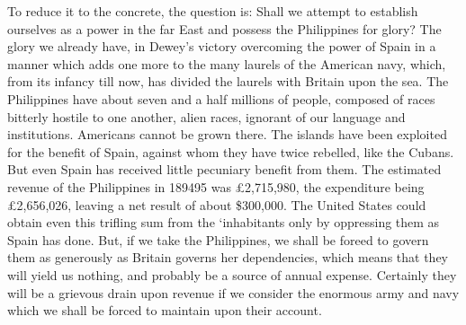 \documentclass[11pt,openany]{book}
\begin{document}
To reduce it to the concrete, the question is: Shall we attempt to establish ourselves as a power in the far East and possess the Philippines for glory? The glory we already have, in Dewey's victory overcoming the power of Spain in a manner which adds one more to the many laurels of the American navy, which, from its infancy till now, has divided the laurels with Britain upon the sea. The Philippines have about seven and a half millions of people, composed of races bitterly hostile to one another, alien races, ignorant of our language and institutions. Americans cannot be grown there. The islands have been exploited for the benefit of Spain, against whom they have twice rebelled, like the Cubans. But even Spain has received little pecuniary benefit from them. The estimated revenue of the Philippines in 189495 was £2,715,980, the expenditure being £2,656,026, leaving a net result of about \$300,000. The United States could obtain even this trifling sum from the `inhabitants only by oppressing them as Spain has done. But, if we take the Philippines, we shall be foreed to govern them as generously as Britain governs her dependencies, which means that they will yield us nothing, and probably be a source of annual expense. Certainly they will be a grievous drain upon revenue if we consider the enormous army and navy which we shall be forced to maintain upon their account.
\end{document}
